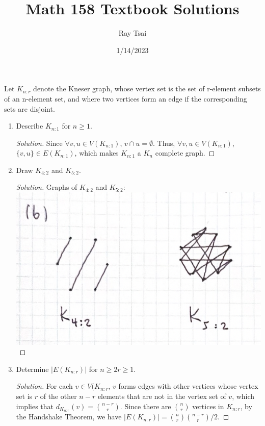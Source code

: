 \documentclass{article}
\title{Math 158 Textbook Solutions}
\author{Ray Tsai}
\date{1/14/2023}
\newenvironment{problem}[2][Problem]{\begin{trivlist}
\item[\hskip \labelsep {\bfseries #1}\hskip \labelsep {\bfseries #2.}]}{\end{trivlist}}
\begin{document}
 

\maketitle 

\begin{problem}{1.7.2}
    Let $K_{n:r}$ denote the Kneser graph, whose vertex set is the set of
    r-element subsets of an n-element set, and where two vertices form an edge if the
    corresponding sets are disjoint.
    \begin{enumerate}[label=(\alph*)]
    \item Describe $K_{n:1}$ for $n \geq 1$.
    \begin{proof}[Solution]
        Since $\forall v,u \in V(K_{n:1})$, $v \cap u = \emptyset$. Thus, $\forall v,u \in V(K_{n:1})$, $\{v, u\} \in E(K_{n:1})$, which makes $K_{n:1}$ a $K_n$ complete graph.
    \end{proof}
    
    \item Draw $K_{4:2}$ and $K_{5:2}$.
    \begin{proof}[Solution]
        Graphs of $K_{4:2}$ and $K_{5:2}$: \\
        \includegraphics[width=.93\textwidth]{Q172b}
    \end{proof}

    \item Determine $|E({K_{n:r}})|$ for $n \geq 2r \geq 1$.
    
    \begin{proof}[Solution]
        For each $v \in V(K_{n:r}$, $v$ forms edges with other vertices whose vertex set is $r$ of the other $n-r$ elements that are not in the vertex set of $v$, which implies that $d_{K_{n:r}}(v) = {{n-r} \choose {r}}$. Since there are $n \choose r$ vertices in $K_{n:r}$, by the Handshake Theorem, we have  $|E(K_{n:r})| = \binom{n}{r}\binom{n-r}{r}/2$.
    \end{proof}
\end{enumerate}
\end{problem}
\end{document}
